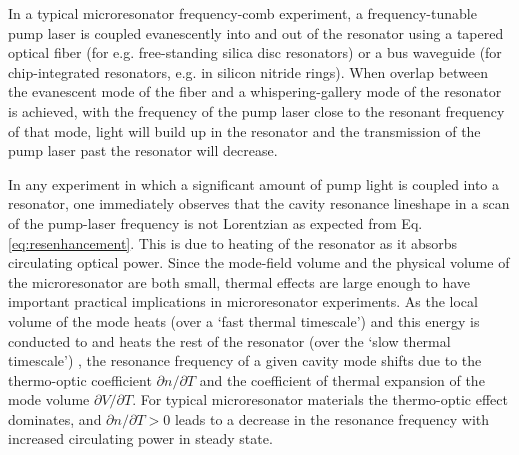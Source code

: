 
In a typical microresonator frequency-comb experiment, a frequency-tunable pump laser is coupled evanescently into and out of the resonator using a tapered optical fiber (for e.g. free-standing silica disc resonators) or a bus waveguide (for chip-integrated resonators, e.g. in silicon nitride rings). When overlap between the evanescent mode of the fiber and a whispering-gallery mode of the resonator is achieved, with the frequency of the pump laser close to the resonant frequency of that mode, light will build up in the resonator and the transmission of the pump laser past the resonator will decrease.

In any experiment in which a significant amount of pump light is coupled into a resonator, one immediately observes that the cavity resonance lineshape in a scan of the pump-laser frequency is not Lorentzian as expected from Eq. \ref{eq:resenhancement}. This is due to heating of the resonator as it absorbs circulating optical power. Since the mode-field volume and the physical volume of the microresonator are both small, thermal effects are large enough to have important practical implications in microresonator experiments. As the local volume of the mode heats (over a `fast thermal timescale') and this energy is conducted to and heats the rest of the resonator (over the `slow thermal timescale') \cite{Ilchenko1992}, the resonance frequency of a given cavity mode shifts due to the thermo-optic coefficient $\partial n/\partial T$ and the coefficient of thermal expansion of the mode volume $\partial V/\partial T$. For typical microresonator materials the thermo-optic effect dominates, and $\partial n/\partial T>0$ leads to a decrease in the resonance frequency with increased circulating power in steady state.

